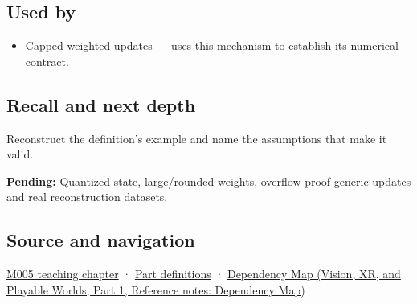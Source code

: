 \subsection{Used by}\label{appendix-260182e617b7-used-by}

\hypertarget{appendix-260182e617b7-used-by}{}

\begin{itemize}
\tightlist
\item
  \hyperref[appendix-1e45d0613db3]{Capped weighted updates} --- uses this mechanism to establish its numerical contract.
\end{itemize}

\subsection{Recall and next depth}\label{appendix-260182e617b7-recall-and-next-depth}

\hypertarget{appendix-260182e617b7-recall-and-next-depth}{}

Reconstruct the definition's example and name the assumptions that make it valid.

\textbf{Pending:} Quantized state, large/rounded weights, overflow-proof generic updates and real reconstruction datasets.

\subsection{Source and navigation}\label{appendix-260182e617b7-source-and-navigation}

\hypertarget{appendix-260182e617b7-source-and-navigation}{}

\hyperref[01-foundations-i-ch001-when-arithmetic-meets-uncertainty]{M005 teaching chapter} · \hyperref[appendix-fd090d982a15-m005---parts-77-88]{Part definitions} · \href{../07-Vision-XR-and-Playable-Worlds-P01/main.pdf\#nameddest=appendix-4ad47bdd269a}{Dependency Map (Vision, XR, and Playable Worlds, Part 1, Reference notes: Dependency Map)}
